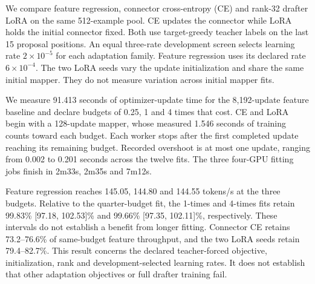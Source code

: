 \documentclass{article}
\begin{document}
We compare feature regression, connector cross-entropy (CE) and rank-32
drafter LoRA on the same 512-example pool. CE updates the connector while
LoRA holds the initial connector fixed. Both use target-greedy teacher
labels on the last 15 proposal positions. An equal three-rate development
screen selects learning rate $2\times10^{-5}$ for each adaptation family.
Feature regression uses its declared rate $6\times10^{-4}$.
The two LoRA seeds vary the update initialization and share the same
initial mapper. They do not measure variation across initial mapper fits.

We measure 91.413 seconds of optimizer-update time for the 8,192-update
feature baseline and declare budgets of 0.25, 1 and 4 times that cost.
CE and LoRA begin with a 128-update mapper, whose measured 1.546 seconds
of training counts toward each budget. Each worker stops after the first
completed update reaching its remaining budget. Recorded overshoot is at
most one update, ranging from 0.002 to 0.201 seconds across the twelve fits.
The three four-GPU fitting jobs finish in 2m33s, 2m35s and 7m12s.

\begin{table}[H]
\caption{Measured training costs and subsequent decoding in one common
development campaign. Worker time includes model/cache setup, validation
and export where performed, plus the measured initial mapper worker cost
for CE and LoRA. It excludes Python startup and shared cache construction.
Ratios compare against feature regression at the same warm budget.}
\label{tab:timed-budget}
\centering\footnotesize
\setlength{\tabcolsep}{3pt}

\end{table}

\begin{table}[H]
\caption{References measured within the same budget-decoding campaign.
The initial mapper has 128 feature-regression updates. The 8,192-update
reference is an existing saved checkpoint.}
\label{tab:timed-controls}
\centering\footnotesize

\end{table}

Feature regression reaches 145.05, 144.80 and 144.55 tokens/s at the
three budgets. Relative to the quarter-budget fit, the 1-times and
4-times fits retain 99.83\% [97.18, 102.53]\% and 99.66\%
[97.35, 102.11]\%, respectively. These intervals do not establish a
benefit from longer fitting. Connector CE retains 73.2--76.6\% of
same-budget feature throughput, and the two LoRA seeds retain
79.4--82.7\%. This result concerns the declared teacher-forced objective,
initialization, rank and development-selected learning rates. It does not
establish that other adaptation objectives or full drafter training fail.
\end{document}
